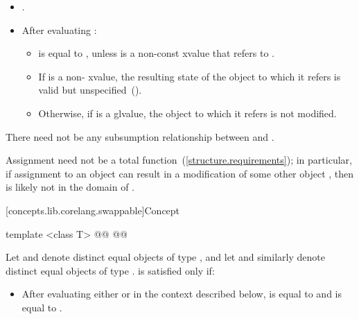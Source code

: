 \begin{addedblock}
\begin{itemdescr}
\begin{itemize}
\item {}.

\item After evaluating :

\begin{itemize}
\item {} is equal to , unless  is a non-const
xvalue that refers to .

\item If  is a non- xvalue, the resulting state of the
object to which it refers is valid but unspecified~().

\item Otherwise, if  is a glvalue, the object to which it refers is not
modified.
\end{itemize}
\end{itemize}

\pnum
There need not be any subsumption relationship between 
and .

\pnum
\enternote Assignment need not be a total function~(\ref{structure.requirements});
in particular, if assignment to an object  can result in a modification
of some other object , then  is likely not in the domain
of \tcode{=}. \exitnote
\end{itemdescr}

[concepts.lib.corelang.swappable]{Concept }

%
\begin{itemdecl}
template <class T>
@@
@@
\end{itemdecl}

{\color{newclr}
\begin{itemdescr}
\pnum
Let  and  denote distinct equal objects of type ,
and let  and  similarly denote distinct equal objects of type
.  is satisfied only if:
\begin{itemize}
\item After evaluating either  or  in the
  context described below,  is equal to  and  is
  equal to .
\end{itemize}


\end{itemdescr}}
\end{addedblock}
